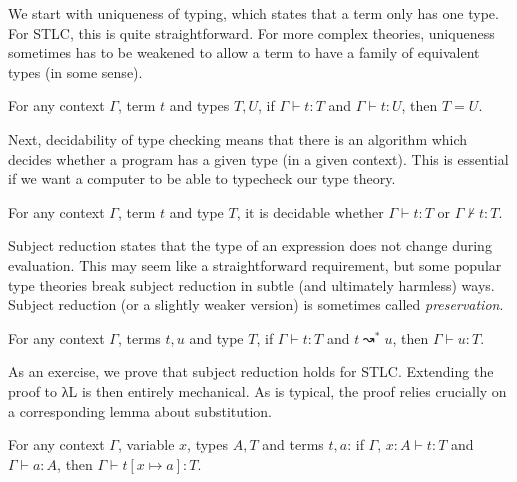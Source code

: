 \documentclass{scrartcl}
\theoremstyle{definition}
\begin{document}
We start with uniqueness of typing, which states that a term only has one type.
For STLC, this is quite straightforward.
For more complex theories, uniqueness sometimes has to be weakened to allow a term to have a family of equivalent types (in some sense).

\begin{theorem}
  For any context $Γ$, term $t$ and types $T,U$, if $Γ ⊢ t : T$ and $Γ ⊢ t : U$, then $T = U$.
\end{theorem}

Next, decidability of type checking means that there is an algorithm which decides whether a program has a given type (in a given context).
This is essential if we want a computer to be able to typecheck our type theory.

\begin{theorem}
  For any context $Γ$, term $t$ and type $T$, it is decidable whether $Γ ⊢ t : T$ or $Γ ⊬ t : T$.
\end{theorem}

Subject reduction states that the type of an expression does not change during evaluation.
This may seem like a straightforward requirement, but some popular type theories break subject reduction in subtle (and ultimately harmless) ways.
Subject reduction (or a slightly weaker version) is sometimes called \emph{preservation}.

\begin{theorem}\label{th:subject-reduction}
  For any context $Γ$, terms $t,u$ and type $T$, if $Γ ⊢ t : T$ and $t ↝^{*} u$, then $Γ ⊢ u : T$.
\end{theorem}

As an exercise, we prove that subject reduction holds for STLC.\@
Extending the proof to λL is then entirely mechanical.
As is typical, the proof relies crucially on a corresponding lemma about substitution.

\begin{lemma}\label{th:subst-typing}
  For any context $Γ$, variable $x$, types $A, T$ and terms $t, a$: if $Γ,\, x : A ⊢ t : T$ and $Γ ⊢ a : A$, then $Γ ⊢ t[x ↦ a] : T$.
\end{lemma}
\end{document}
